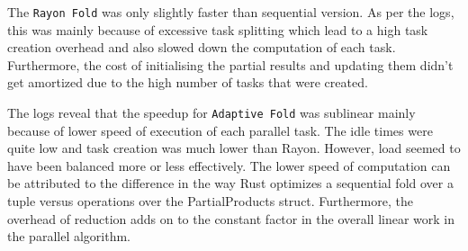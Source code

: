 The \texttt{Rayon Fold} was only slightly faster than sequential version. As per the logs, this was mainly because of excessive task splitting which lead to a high task creation overhead and also slowed down the computation of each task. Furthermore, the cost of initialising the partial results and updating them didn't get amortized due to the high number of tasks that were created.

The logs reveal that the speedup for \texttt{Adaptive Fold} was sublinear mainly because of lower speed of execution of each parallel task. The idle times were quite low and task creation was much lower than Rayon. However, load seemed to have been balanced more or less effectively. The lower speed of computation can be attributed to the difference in the way Rust optimizes a sequential fold over a tuple versus operations over the PartialProducts struct. Furthermore, the overhead of reduction adds on to the constant factor in the overall linear work in the parallel algorithm.
